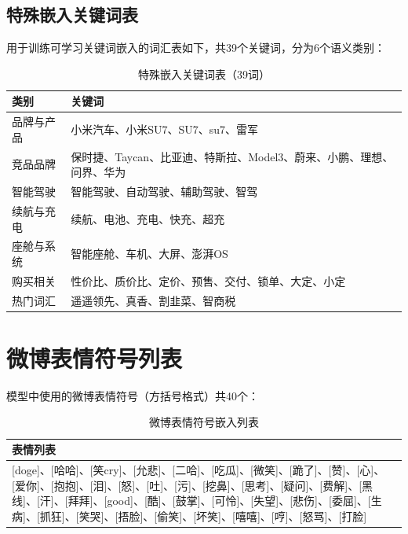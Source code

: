 \documentclass[10pt]{article}
\begin{document}
\subsection{特殊嵌入关键词表}

用于训练可学习关键词嵌入的词汇表如下，共39个关键词，分为6个语义类别：

\begin{table}[H]
\centering
\caption{特殊嵌入关键词表（39词）}
\label{tab:embed_keywords}
\begin{tabular}{ll}
\toprule
\textbf{类别} & \textbf{关键词} \\
\midrule
品牌与产品 & 小米汽车、小米SU7、SU7、su7、雷军 \\
竞品品牌 & 保时捷、Taycan、比亚迪、特斯拉、Model3、蔚来、小鹏、理想、问界、华为 \\
智能驾驶 & 智能驾驶、自动驾驶、辅助驾驶、智驾 \\
续航与充电 & 续航、电池、充电、快充、超充 \\
座舱与系统 & 智能座舱、车机、大屏、澎湃OS \\
购买相关 & 性价比、质价比、定价、预售、交付、锁单、大定、小定 \\
热门词汇 & 遥遥领先、真香、割韭菜、智商税 \\
\bottomrule
\end{tabular}
\end{table}

\section{微博表情符号列表}
\label{appendix:emoji}

模型中使用的微博表情符号（方括号格式）共40个：

\begin{table}[H]
\centering
\caption{微博表情符号嵌入列表}
\label{tab:weibo_emoji}
\begin{tabular}{p{12cm}}
\toprule
\textbf{表情列表} \\
\midrule
{[}doge{]}、{[}哈哈{]}、{[}笑cry{]}、{[}允悲{]}、{[}二哈{]}、{[}吃瓜{]}、{[}微笑{]}、{[}跪了{]}、{[}赞{]}、{[}心{]}、{[}爱你{]}、{[}抱抱{]}、{[}泪{]}、{[}怒{]}、{[}吐{]}、{[}污{]}、{[}挖鼻{]}、{[}思考{]}、{[}疑问{]}、{[}费解{]}、{[}黑线{]}、{[}汗{]}、{[}拜拜{]}、{[}good{]}、{[}酷{]}、{[}鼓掌{]}、{[}可怜{]}、{[}失望{]}、{[}悲伤{]}、{[}委屈{]}、{[}生病{]}、{[}抓狂{]}、{[}笑哭{]}、{[}捂脸{]}、{[}偷笑{]}、{[}坏笑{]}、{[}嘻嘻{]}、{[}哼{]}、{[}怒骂{]}、{[}打脸{]} \\
\bottomrule
\end{tabular}
\end{table}
\end{document}
